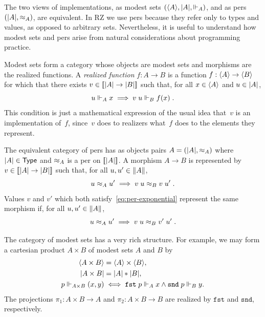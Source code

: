 The two views of implementations, as modest sets $(\langle A \rangle,
|A|, {\Vdash_A})$, and as pers $(|A|, {\approx_A})$, are
equivalent. In RZ we use pers because they refer only to types and
values, as opposed to arbitrary sets. Nevertheless, it is useful to
understand how modest sets and pers arise from natural considerations
about programming practice.

Modest sets form a category whose objects are modest sets and
morphisms are the realized functions. A \emph{realized function} $f :
A \to B$ is a function $f : \langle A \rangle \to \langle B \rangle$ for which that there
exists $v \in [\![|A| \to |B|]\!]$ such that, for all
$x \in \langle A \rangle$ and $u \in |A|$,
%
\begin{equation}
  \label{eq:rz-function-space}
  u \Vdash_A x \implies v\;u \Vdash_B f(x) \;.
\end{equation}
%
This condition is just a mathematical expression of the usual idea
that~$v$ is an implementation of~$f$, since~$v$ does to realizers
what~$f$ does to the elements they represent.

The equivalent category of pers has as objects pairs $A = (|A|,
{\approx_A})$ where $|A| \in \mathsf{Type}$ and $\approx_A$ is a per on
$[\![|A|]\!]$. A morphism $A \to B$ is represented by $v
\in [\![|A| \to |B|]\!]$ such that, for all $u, u'
\in \|A\|$,
%
\begin{equation}
  \label{eq:per-exponential}
  u \approx_A u' \implies v\;u \approx_B v\;u' \;.
\end{equation}
%
Values $v$ and $v'$ which both satisfy~\eqref{eq:per-exponential}
represent the same morphism if, for all $u, u' \in \|A\|$,
%
\begin{equation*}
  u \approx_A u' \implies v\;u \approx_B v'\;u' \;.
\end{equation*}

The category of modest sets has a very rich structure. For example, we
may form a cartesian product $A \times B$ of modest sets $A$ and $B$
by
%
\begin{align*}
  \langle A \times B \rangle &= \langle A \rangle \times \langle B \rangle,\\
  |A \times B| &= |A| * |B|,\\
  p \Vdash_{A \times B} (x,y) &\iff
  \mathtt{fst}\;p \Vdash_A x \land \mathtt{snd}\;p \Vdash_B y.
\end{align*}
%
The projections $\pi_1 : A \times B \to A$ and $\pi_2 : A \times B \to
B$ are realized by $\mathtt{fst}$ and $\mathtt{snd}$, respectively.

